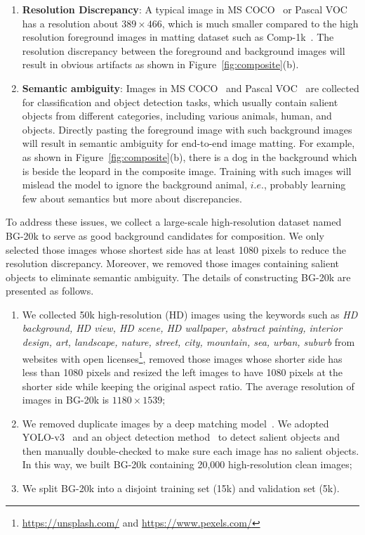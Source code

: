\documentclass[twocolumn]{svjour3}
\begin{document}
\begin{enumerate}
  \item \textbf{Resolution Discrepancy}: A typical image in MS COCO~\citep{lin2014microsoft} or Pascal VOC~\citep{everingham2010pascal} has a resolution about $389\times466$, which is much smaller compared to the high resolution foreground images in matting dataset such as Comp-1k~\citep{xu2017deep}. The resolution discrepancy between the foreground and background images will result in obvious artifacts as shown in Figure~\ref{fig:composite}(b).
  \item \textbf{Semantic ambiguity}: Images in MS COCO~\citep{lin2014microsoft} and Pascal VOC~\citep{everingham2010pascal} are collected for classification and object detection tasks, which usually contain salient objects from different categories, including various animals, human, and objects. Directly pasting the foreground image with such background images will result in semantic ambiguity for end-to-end image matting. For example, as shown in Figure~\ref{fig:composite}(b), there is a dog in the background which is beside the leopard in the composite image. Training with such images will mislead the model to ignore the background animal, $i.e.$, probably learning few about semantics but more about discrepancies.
\end{enumerate}

To address these issues, we collect a large-scale high-resolution dataset named BG-20k to serve as good background candidates for composition. We only selected those images whose shortest side has at least 1080 pixels to reduce the resolution discrepancy. Moreover, we removed those images containing salient objects to eliminate semantic ambiguity. The details of constructing BG-20k are presented as follows.

\begin{enumerate}
  \item We collected 50k high-resolution (HD) images using the keywords such as \textit{HD background, HD view, HD scene, HD wallpaper, abstract painting, interior design, art, landscape, nature, street, city, mountain, sea, urban, suburb} from websites with open licenses\footnote{\url{https://unsplash.com/} and \url{https://www.pexels.com/}}, removed those images whose shorter side has less than 1080 pixels and resized the left images to have 1080 pixels at the shorter side while keeping the original aspect ratio. The average resolution of images in BG-20k is $1180\times1539$;
  \item We removed duplicate images by a deep matching model~\citep{krizhevsky2012imagenet}. We adopted YOLO-v3~\citep{redmon2018yolov3} and an object detection method~\citep{chen2021recursive} to detect salient objects and then manually double-checked to make sure each image has no salient objects. In this way, we built BG-20k containing 20,000 high-resolution clean images;
  \item We split BG-20k into a disjoint training set (15k) and validation set (5k).
\end{enumerate}
\end{document}
